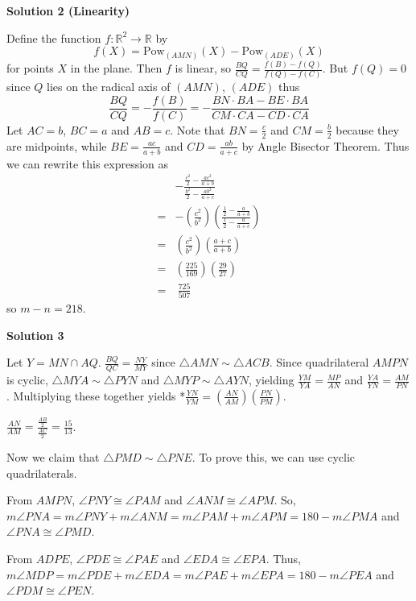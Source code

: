 \begin{enumerate}
 



\textbf{Solution 2 (Linearity)}

Define the function $f:\mathbb{R}^{2}\rightarrow\mathbb{R}$ by 
 \[f(X)=\text{Pow}_{(AMN)}(X)-\text{Pow}_{(ADE)}(X)\] for points $X$ in the plane. Then $f$ is linear, so $\frac{BQ}{CQ}=\frac{f(B)-f(Q)}{f(Q)-f(C)}$. But $f(Q)=0$ since $Q$ lies on the radical axis of $(AMN)$, $(ADE)$ thus 
 \[\frac{BQ}{CQ}=-\frac{f(B)}{f(C)}=-\frac{BN\cdot BA-BE\cdot BA}{CM\cdot CA-CD\cdot CA}\] Let $AC=b$, $BC=a$ and $AB=c$. Note that $BN=\frac{c}{2}$ and $CM=\frac{b}{2}$ because they are midpoints, while $BE=\frac{ac}{a+b}$ and $CD=\frac{ab}{a+c}$ by Angle Bisector Theorem. Thus we can rewrite this expression as 
 \begin{align*}&-\frac{\frac{c^{2}}{2}-\frac{ac^{2}}{a+b}}{\frac{b^{2}}{2}-\frac{ab^{2}}{a+c}} \\ =&-\left(\frac{c^{2}}{b^{2}}\right)\left(\frac{\frac{1}{2}-\frac{a}{a+b}}{\frac{1}{2}-\frac{a}{a+c}}\right) \\ =&\left(\frac{c^{2}}{b^{2}}\right)\left(\frac{a+c}{a+b}\right) \\ =&\left(\frac{225}{169}\right)\left(\frac{29}{27}\right) \\ =&~\frac{725}{507}\end{align*}
 so $m-n=\boxed{218}$.

 



\textbf{Solution 3}

Let $Y = MN \cap AQ$. $\frac {BQ}{QC} = \frac {NY}{MY}$ since $\triangle AMN \sim \triangle ACB$. Since quadrilateral $AMPN$ is cyclic, $\triangle MYA \sim \triangle PYN$ and $\triangle MYP \sim \triangle AYN$, yielding $\frac {YM}{YA} = \frac {MP}{AN}$ and $\frac {YA}{YN} = \frac {AM}{PN}$. Multiplying these together yields *$\frac {YN}{YM} = \left(\frac {AN}{AM}\right) \left(\frac {PN}{PM}\right)$.

 $\frac {AN}{AM} = \frac {\frac {AB}{2}}{\frac {AC}{2}} = \frac {15}{13}$. 

 Now we claim that $\triangle PMD \sim \triangle PNE$. To prove this, we can use cyclic quadrilaterals.

 From $AMPN$, $\angle PNY \cong \angle PAM$ and $\angle ANM \cong \angle APM$. So, $m\angle PNA = m\angle PNY + m\angle ANM = m\angle PAM + m\angle APM = 180-m\angle PMA$ and $\angle PNA \cong \angle PMD$.

 From $ADPE$, $\angle PDE \cong \angle PAE$ and $\angle EDA \cong \angle EPA$. Thus, $m\angle MDP = m\angle PDE + m\angle EDA =  m\angle PAE + m\angle EPA = 180-m\angle PEA$ and $\angle PDM \cong \angle PEN$.


\end{enumerate}
